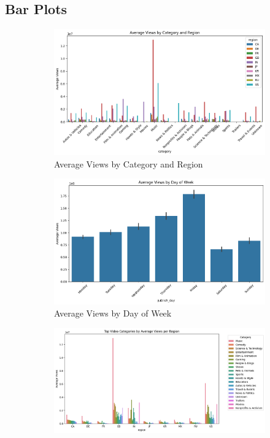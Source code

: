 \documentclass[a4paper]{article}
\begin{document}
\subsection{Bar Plots}
\begin{figure}[h]
    \centering
    \begin{subfigure}{0.32\textwidth}
        \includegraphics[width=\linewidth]{bar1.png}
        \caption{Average Views by Category and Region}
        \label{fig:sub1}
    \end{subfigure}
    \hfill
    \begin{subfigure}{0.32\textwidth}
        \includegraphics[width=\linewidth]{bar3.png}
        \caption{Average Views by Day of Week}
        \label{fig:sub2}
    \end{subfigure}
    \hfill
    \begin{subfigure}{0.32\textwidth}
        \includegraphics[width=\linewidth]{bar2.png}

\end{subfigure}
\end{figure}
\end{document}
